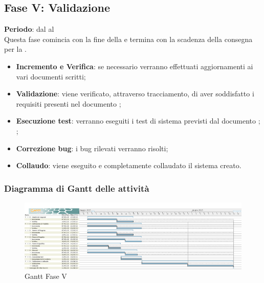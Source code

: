 \subsection{Fase V: Validazione}
	\textbf{Periodo}: dal  al  \\Questa fase comincia con la fine della  e termina con la scadenza della consegna per la .
	\begin{itemize}
		\item \textbf{Incremento e Verifica}: se necessario verranno effettuati aggiornamenti ai vari documenti scritti;
		\item \textbf{Validazione}: viene verificato, attraverso tracciamento, di aver soddisfatto i requisiti presenti nel documento ;
		\item \textbf{Esecuzione test}: verranno eseguiti i test di sistema previsti dal documento ;
;
		\item \textbf{Correzione bug}: i bug rilevati verranno risolti;
		\item \textbf{Collaudo}: viene eseguito e completamente collaudato il sistema creato.
	\end{itemize}
	\subsubsection{Diagramma di Gantt delle attività}
		\begin{figure}[H]\centering
			\includegraphics[width=\textwidth]{PianoDiProgetto/Pics/FaseV.png}
		\caption{Gantt Fase V}
\end{figure}

